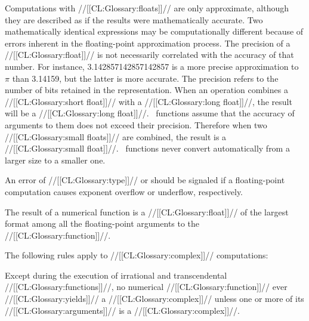 Computations with //[[CL:Glossary:floats]]// are only approximate, although they are described as if the results were mathematically accurate.  Two mathematically identical expressions may be computationally different because of errors inherent in the floating-point approximation process. The precision of a //[[CL:Glossary:float]]// is not necessarily correlated with the accuracy of that number. For instance, 3.142857142857142857 is a more precise approximation to $\pi$ than 3.14159, but the latter is more accurate. The precision refers to the number of bits retained in the representation. When an operation combines a //[[CL:Glossary:short float]]// with a  //[[CL:Glossary:long float]]//, the result will be a //[[CL:Glossary:long float]]//.  \clisp\ functions assume that the accuracy of arguments to them does not exceed their precision.  Therefore when two //[[CL:Glossary:small floats]]//  are combined, the result is a //[[CL:Glossary:small float]]//.  \clisp\ functions  never convert automatically from a larger size to a smaller one. \endsubsubsection%


An error of //[[CL:Glossary:type]]//  or  should be signaled if a  floating-point computation causes exponent overflow or underflow, respectively.

\endsubsubsection%

  

The result of a numerical function is a //[[CL:Glossary:float]]// of the  largest format among all the floating-point arguments to the //[[CL:Glossary:function]]//. 

\endsubsubsection%

\endsubsection%

The following rules apply to //[[CL:Glossary:complex]]// computations:


Except during the execution of irrational and transcendental //[[CL:Glossary:functions]]//, no numerical //[[CL:Glossary:function]]// ever //[[CL:Glossary:yields]]// a //[[CL:Glossary:complex]]// unless  one or more of its //[[CL:Glossary:arguments]]// is a //[[CL:Glossary:complex]]//.

